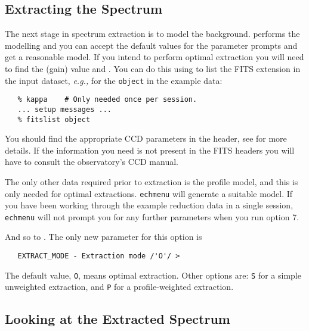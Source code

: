 \subsection{Extracting the Spectrum}

The next stage in spectrum extraction is to model the background.
performs the modelling and you can accept the default values for
the parameter prompts and get a reasonable model.
If you intend to perform optimal extraction you will need to find the
 (gain) value and
\@.
You can do this using 
to list the FITS extension in the input dataset, {\it{e.g.,}}
for the \verb+object+ in the example data:

{
\scspec{\small}{ }
\begin{verbatim}
   % kappa    # Only needed once per session.
   ... setup messages ...
   % fitslist object
\end{verbatim}
}

You should find the appropriate CCD parameters in the header, see
\scspec{\S\ref{cook_ccdchar}}
{}
for more details.  If the information you need is not present in the FITS
headers you will have to consult the observatory's CCD manual.

The only other data required prior to extraction is the profile model,
and this is only needed for optimal extractions.
\verb+echmenu+ 
will generate a suitable model.
If you have been working through the example reduction data in a
single session, \verb+echmenu+ will not prompt you for any further parameters
when you run option 7.

And so to .
The only new parameter for this option is

{
\scspec{\small}{ }
\begin{verbatim}
   EXTRACT_MODE - Extraction mode /'O'/ >
\end{verbatim}
}

The default value, \verb+O+, means optimal extraction.  Other options are:
\verb+S+ for a simple unweighted extraction, and \verb+P+ for a
profile-weighted extraction.


\subsection{Looking at the Extracted Spectrum}

